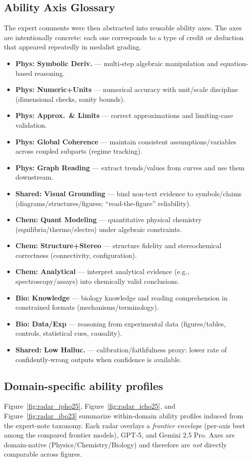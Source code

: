 \documentclass[11pt]{article}
\begin{document}
\subsection{Ability Axis Glossary}
\label{sec:append-ability}
The expert comments were then abstracted into reusable ability axes.
The axes are intentionally concrete: each one corresponds to a type of credit or deduction that appeared repeatedly in medalist grading.
\begin{itemize}[leftmargin=*, noitemsep, topsep=2pt]
\item \textbf{Phys: Symbolic Deriv.} --- multi-step algebraic manipulation and equation-based reasoning.
\item \textbf{Phys: Numeric+Units} --- numerical accuracy with unit/scale discipline (dimensional checks, sanity bounds).
\item \textbf{Phys: Approx.\ \& Limits} --- correct approximations and limiting-case validation.
\item \textbf{Phys: Global Coherence} --- maintain consistent assumptions/variables across coupled subparts (regime tracking).
\item \textbf{Phys: Graph Reading} --- extract trends/values from curves and use them downstream.
\item \textbf{Shared: Visual Grounding} --- bind non-text evidence to symbols/claims (diagrams/structures/figures; ``read-the-figure'' reliability).
\item \textbf{Chem: Quant Modeling} --- quantitative physical chemistry (equilibria/thermo/electro) under algebraic constraints.
\item \textbf{Chem: Structure+Stereo} --- structure fidelity and stereochemical correctness (connectivity, configuration).
\item \textbf{Chem: Analytical} --- interpret analytical evidence (e.g., spectroscopy/assays) into chemically valid conclusions.
\item \textbf{Bio: Knowledge} --- biology knowledge and reading comprehension in constrained formats (mechanisms/terminology).
\item \textbf{Bio: Data/Exp} --- reasoning from experimental data (figures/tables, controls, statistical cues, causality).
\item \textbf{Shared: Low Halluc.} --- calibration/faithfulness proxy: lower rate of confidently-wrong outputs when confidence is available.
\end{itemize}

\subsection{Domain-specific ability profiles}
\label{app:domain_radars}
Figure~\ref{fig:radar_ipho25}, Figure~\ref{fig:radar_icho25}, and Figure~\ref{fig:radar_ibo23} summarize within-domain ability profiles induced from the expert-note taxonomy.
Each radar overlays a \emph{frontier envelope} (per-axis best among the compared frontier models), GPT-5, and Gemini 2.5 Pro.
Axes are domain-native (Physics/Chemistry/Biology) and therefore are \emph{not} directly comparable across figures.
\end{document}
